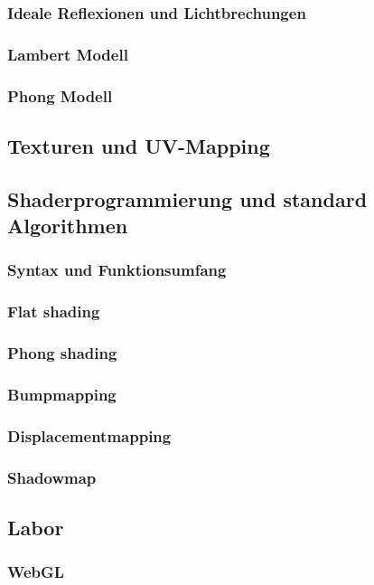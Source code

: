\subsubsection{Ideale Reflexionen und Lichtbrechungen}
\subsubsection{Lambert  Modell}
\subsubsection{Phong Modell}

\subsection{Texturen und UV-Mapping}
\subsection{Shaderprogrammierung und standard Algorithmen}
\subsubsection{Syntax und Funktionsumfang}
\subsubsection{Flat  shading}
\subsubsection{Phong  shading}
\subsubsection{Bumpmapping}
\subsubsection{Displacementmapping}
\subsubsection{Shadowmap}

\subsection{Labor}
\subsubsection{WebGL}
